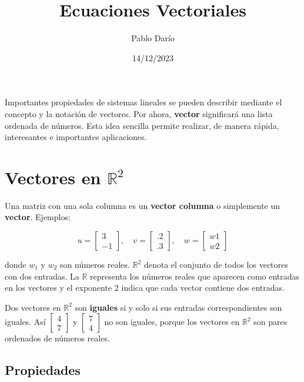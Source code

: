 \documentclass{article}
\title{Ecuaciones Vectoriales}
\author{Pablo Darío}
\date{14/12/2023}
\begin{document}
\maketitle

Importantes propiedades de sistemas lineales se pueden describir mediante el concepto y la notación de vectores. Por ahora, \textbf{vector} significará una lista ordenada de números. Esta idea sencilla permite realizar, de manera rápida, interesantes e importantes aplicaciones.

\section*{Vectores en $\mathbb{R}^2$}
 
Una matriz con una sola columna es un \textbf{vector columna} o simplemente un \textbf{vector}. Ejemplos:

\begin{equation*}
    u = \begin{bmatrix}
        3\\
        -1
    \end{bmatrix}
    , \quad v = \begin{bmatrix}
        .2\\
        .3
    \end{bmatrix}
    , \quad w = \begin{bmatrix}
        w1\\
        w2
    \end{bmatrix}
\end{equation*}

donde $w_1$ y $w_2$ son números reales. $\mathbb{R}^2$ denota el conjunto de todos los vectores con dos entradas. La $\mathbb{R}$ representa los números reales que aparecen como entradas en los vectores y el exponente $2$ indica que cada vector contiene dos entradas.

Dos vectores en $\mathbb{R}^2$ son \textbf{iguales} si y solo si sus entradas correspondientes son iguales. Así $\begin{bmatrix} 4\\7 \end{bmatrix}$ y $\begin{bmatrix} 7\\4 \end{bmatrix}$ no son iguales, porque los vectores en $\mathbb{R}^2$ son pares ordenados de números reales.

\subsection*{Propiedades}
\end{document}
